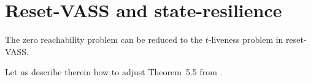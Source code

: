 

\section{Reset-VASS and state-resilience}\label{appendix}






\begin{proposition}\label{liveness reset}
The  zero reachability problem can be reduced to the $t$-liveness problem in reset-VASS.
\end{proposition}



Let us describe therein how to adjust Theorem~5.5 from \cite{peterson1981petri}.

